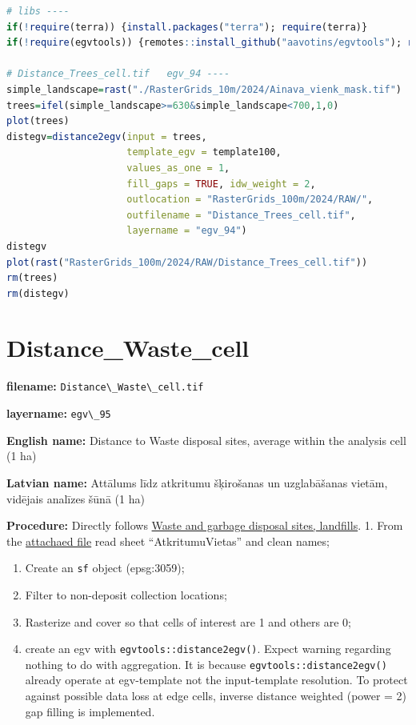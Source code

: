 \documentclass[
]{book}
\newcommand{\passthrough}[1]{#1}
\begin{document}
\begin{lstlisting}[language=R]
# libs ----
if(!require(terra)) {install.packages("terra"); require(terra)}
if(!require(egvtools)) {remotes::install_github("aavotins/egvtools"); require(egvtools)}

# Distance_Trees_cell.tif   egv_94 ----
simple_landscape=rast("./RasterGrids_10m/2024/Ainava_vienk_mask.tif")
trees=ifel(simple_landscape>=630&simple_landscape<700,1,0)
plot(trees)
distegv=distance2egv(input = trees,
                     template_egv = template100,
                     values_as_one = 1,
                     fill_gaps = TRUE, idw_weight = 2,
                     outlocation = "RasterGrids_100m/2024/RAW/",
                     outfilename = "Distance_Trees_cell.tif",
                     layername = "egv_94")
distegv
plot(rast("RasterGrids_100m/2024/RAW/Distance_Trees_cell.tif"))
rm(trees)
rm(distegv)
\end{lstlisting}

\section{Distance\_Waste\_cell}\label{ch06.095}

\textbf{filename:} \passthrough{\lstinline!Distance\_Waste\_cell.tif!}

\textbf{layername:} \passthrough{\lstinline!egv\_95!}

\textbf{English name:} Distance to Waste disposal sites, average within the analysis cell (1 ha)

\textbf{Latvian name:} Attālums līdz atkritumu šķirošanas un uzglabāšanas vietām, vidējais analīzes šūnā (1 ha)

\textbf{Procedure:} Directly follows \hyperref[Ch04.14]{Waste and garbage disposal sites, landfills}.
1. From the \href{https://github.com/aavotins/HiQBioDiv_EGVs/blob/main/Data/Geodata/2024/GarbageWasteLandfills/Atkritumi.xlsx}{attachaed file} read sheet ``AtkritumuVietas'' and clean names;

\begin{enumerate}
\def\labelenumi{\arabic{enumi}.}
\setcounter{enumi}{1}
\item
  Create an \passthrough{\lstinline!sf!} object (epsg:3059);
\item
  Filter to non-deposit collection locations;
\item
  Rasterize and cover so that cells of interest are 1 and others are 0;
\item
  create an egv with \passthrough{\lstinline!egvtools::distance2egv()!}. Expect warning regarding nothing
  to do with aggregation. It is because \passthrough{\lstinline!egvtools::distance2egv()!} already operate at
  egv-template not the input-template resolution. To protect against possible data loss at edge cells,
  inverse distance weighted (power = 2) gap filling is implemented.
\end{enumerate}
\end{document}
